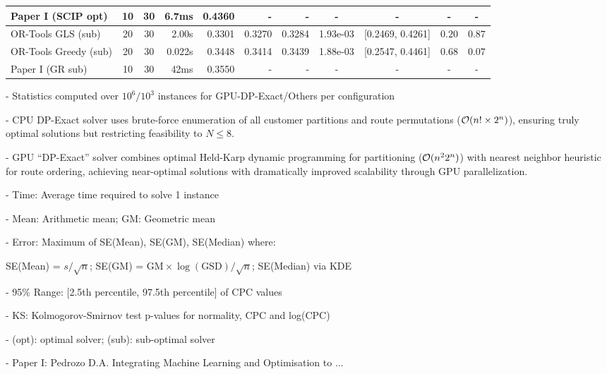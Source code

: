 \documentclass[a4paper,twoside]{article}
\begin{document}
\begin{table}[htbp]
\begin{tabular}{@{}l c c r r r r c c c c@{}}
\rowcolor{gray!20}  Paper I (SCIP opt)    & 10 & 30 & 6.7ms  & 0.4360 & -      & -      & -        & - & - &- \\             
\midrule
OR-Tools GLS (sub)    & 20 & 30 & 2.00s & 0.3301 & 0.3270 & 0.3284 & 1.93e-03 & [0.2469, 0.4261] & $0.20$ & $0.87$ \\
OR-Tools Greedy (sub) & 20 & 30 & 0.022s & 0.3448 & 0.3414 & 0.3439 & 1.88e-03 & [0.2547, 0.4461] & $0.68$ & $0.07$ \\
\rowcolor{gray!20}  Paper I (GR sub)      & 10 & 30 & 42ms  & 0.3550 & -      & -      & -        & - & - &- \\             
\bottomrule
\end{tabular}
\begin{tablenotes}
\small
\item - Statistics computed over $10^6/10^3$ instances for GPU-DP-Exact/Others per configuration
\item - CPU DP-Exact solver uses brute-force enumeration of all customer partitions and route permutations (${\cal O}(n! \times 2^n)$), ensuring truly optimal solutions but restricting feasibility to $N\le 8$.
\item - GPU ``DP-Exact'' solver combines optimal Held-Karp dynamic programming for partitioning (${\cal O}(n^2 2^n)$) with nearest neighbor heuristic for route ordering, achieving near-optimal solutions with dramatically improved scalability through GPU parallelization.
\item - Time: Average time required to solve 1 instance
\item - Mean: Arithmetic mean; GM: Geometric mean
\item - Error: Maximum of SE(Mean), SE(GM), SE(Median) where:
\item \quad SE(Mean) = $s/\sqrt{n}$; SE(GM) = $\text{GM} \times \log(\text{GSD})/\sqrt{n}$; SE(Median) via KDE
\item - 95\% Range: [2.5th percentile, 97.5th percentile] of CPC values
\item - KS: Kolmogorov-Smirnov test p-values for normality, CPC and log(CPC)
\item - (opt): optimal solver; (sub): sub-optimal solver
\item - Paper I: Pedrozo D.A. Integrating Machine Learning and Optimisation to ...
\end{tablenotes}
\end{table}
\end{document}
